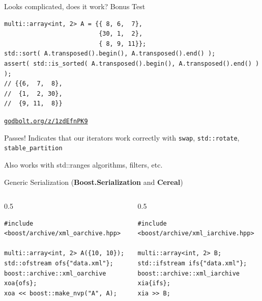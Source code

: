 \documentclass[t,aspectratio=169,handout]{beamer}
\begin{document}
\begin{frame}[fragile]{Looks complicated, does it work? Bonus Test}
\begin{lstlisting}
multi::array<int, 2> A = {{ 8, 6,  7},
                          {30, 1,  2},
                          { 8, 9, 11}};
std::sort( A.transposed().begin(), A.transposed().end() );
assert( std::is_sorted( A.transposed().begin(), A.transposed().end() ) );
// {{6,  7,  8},
//  {1,  2, 30},
//  {9, 11,  8}}
\end{lstlisting}
{\raggedleft\href{https://godbolt.org/z/1zdEfnPK9}{\texttt{godbolt.org/z/1zdEfnPK9}}\par}

{
\begin{alertblock}{Passes!}
  Indicates that our iterators work correctly with \lstinline|swap|, \lstinline|std::rotate|, \lstinline|stable_partition|
\end{alertblock}
}

\begin{block}{}
  Also works with std::ranges algorithms, filters, etc.
\end{block}
\end{frame}

\begin{frame}[fragile]{Generic Serialization (\textbf{Boost.Serialization} and \textbf{Cereal})}

\begin{columns}[T]
\begin{column}{0.5\textwidth}
\begin{lstlisting}
#include <boost/archive/xml_oarchive.hpp>

multi::array<int, 2> A({10, 10});
std::ofstream ofs{"data.xml"};
boost::archive::xml_oarchive xoa{ofs};
xoa << boost::make_nvp("A", A);
\end{lstlisting}
\end{column}
\begin{column}{0.5\textwidth}
\begin{lstlisting}
#include <boost/archive/xml_iarchive.hpp>

multi::array<int, 2> B;
std::ifstream ifs{"data.xml"};
boost::archive::xml_iarchive xia{ifs};
xia >> B;
\end{lstlisting}
\end{column}
\end{columns}

\begin{center}
  
\end{center}
\end{frame}
\end{document}
